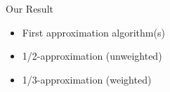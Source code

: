 \begin{frame}{Our Result}
\begin{itemize}
  \item<1> First approximation algorithm(s) 
  \item<2> 1/2-approximation (unweighted)
  \item<3> 1/3-approximation (weighted)
\end{itemize}
\end{frame}